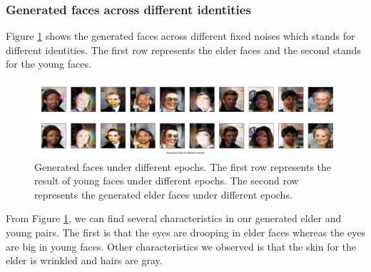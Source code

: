 \documentclass{article}
\begin{document}
\subsubsection{Generated faces across different identities}
Figure \ref{figure: diff_identity} shows the generated faces across different fixed noises which stands for different identities. The first row represents the elder faces and the second stands for the young faces.
\begin{figure}[H]
\begin{center}
  \centering
  \includegraphics[width=5in]{image/identity_variation.png}
\end{center}
\caption{Generated faces under different epochs. The first row represents the result of young faces under different epochs. The second row represents the generated elder faces under different epochs.}
\label{figure: diff_identity}
\end{figure}
From Figure \ref{figure: diff_identity}, we can find several characteristics in our generated elder and young pairs. The first is that the eyes are drooping in elder faces whereas the eyes are big in young faces. Other characteristics we observed is that the skin for the elder is wrinkled and hairs are gray.
\end{document}
